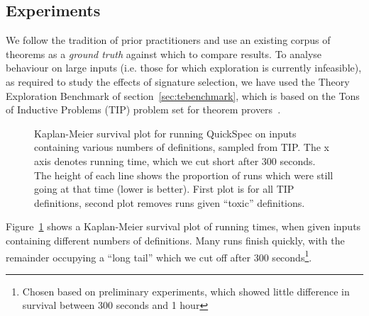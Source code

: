 \fi

\subsection{Experiments}

%
%
%
%

We follow the tradition of prior practitioners and use an existing corpus of
theorems as a \emph{ground truth} against which to compare results. To analyse
behaviour on large inputs (i.e. those for which exploration is currently
infeasible), as required to study the effects of signature selection, we have
used the Theory Exploration Benchmark of section~\ref{sec:tebenchmark}, which is
based on the Tons of Inductive Problems (TIP) problem set for theorem
provers~\cite{claessen2015tip}.

\begin{figure}
  \scalebox{0.45}{}
  \scalebox{0.45}{}
  \caption{Kaplan-Meier survival plot for running QuickSpec on inputs
    containing various numbers of definitions, sampled from TIP. The x axis
    denotes running time, which we cut short after 300 seconds. The height of
    each line shows the proportion of \qspec{} runs which were still going at
    that time (lower is better). First plot is for all TIP definitions, second
    plot removes runs given ``toxic'' definitions.}
  \label{fig:survival}
\end{figure}

Figure~\ref{fig:survival} shows a Kaplan-Meier survival plot of \qspec{} running
times, when given inputs containing different numbers of definitions. Many runs
finish quickly, with the remainder occupying a ``long tail'' which we cut off
after 300 seconds\footnote{Chosen based on preliminary experiments, which showed
  little difference in survival between 300 seconds and 1 hour}.

